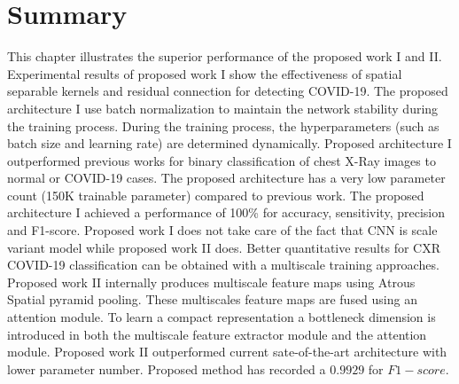 \section{Summary}
This chapter illustrates the superior performance of the proposed work I and II. Experimental results of proposed work I show the effectiveness of spatial separable kernels and residual connection for detecting COVID-19. The proposed architecture I use batch normalization to maintain the network stability during the training process. During the training process, the hyperparameters (such as batch size and learning rate) are determined dynamically. Proposed architecture I outperformed previous works for binary classification of chest X-Ray images to normal or COVID-19 cases. The proposed architecture has a very low parameter count (150K trainable parameter) compared to previous work. The proposed  architecture I achieved a performance of 100\% for accuracy, sensitivity, precision and F1-score. Proposed work I does not take care of the fact that CNN is scale variant model while proposed work II does. Better quantitative results for CXR COVID-19 classification can be obtained with a multiscale training approaches. Proposed work II internally produces multiscale feature maps using Atrous Spatial pyramid pooling. These multiscales feature maps are fused using an attention module. To learn a compact representation a bottleneck dimension is introduced in both the multiscale feature extractor module and the attention module. Proposed work II outperformed current sate-of-the-art architecture with lower parameter number. Proposed method has recorded a $0.9929$ for $F1-score$.